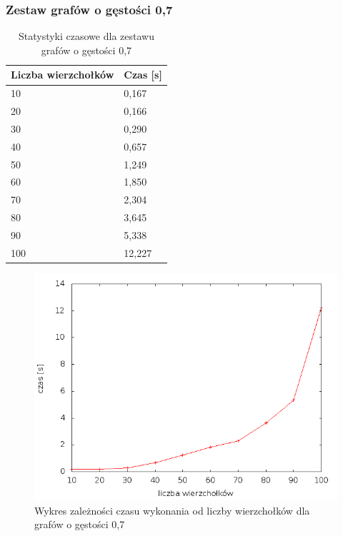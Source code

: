 \documentclass[12pt, a4paper]{article}
\begin{document}
\subsubsection*{Zestaw grafów o gęstości 0,7}
\begin{table}[H]
\caption{Statystyki czasowe dla zestawu grafów o gęstości 0,7}
\begin{center}
    \begin{tabular}{|l|l|}
    \hline
    Liczba wierzchołków & Czas [s] \\ \hline
    10 & 0,167 \\ \hline
    20 & 0,166 \\ \hline
    30 & 0,290 \\ \hline
    40 & 0,657 \\ \hline
    50 & 1,249 \\ \hline
    60 & 1,850 \\ \hline
    70 & 2,304 \\ \hline
    80 & 3,645 \\ \hline
    90 & 5,338 \\ \hline
    100 & 12,227 \\ \hline
    \end{tabular}
\end{center}
\end{table}

\begin{figure}[h]
    \begin{center}
	\includegraphics[scale=0.5]{results/img/den/den_07.png}
	\caption{Wykres zależności czasu wykonania od liczby wierzchołków dla grafów o gęstości 0,7}
    \end{center}
\end{figure}
\end{document}
